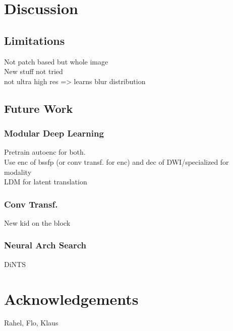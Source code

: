 \chapter{Discussion}\label{\positionnumber}

\section{Limitations}
Not patch based but whole image\\
New stuff not tried\\
not ultra high res => learns blur distribution\\

\section{Future Work}
\subsection{Modular Deep Learning}
Pretrain autoenc for both.\\
Use enc of bssfp (or conv transf. for enc) and dec of DWI/specialized for modality\\
LDM for latent translation\\

\subsection{Conv Transf.}
New kid on the block\\

\subsection{Neural Arch Search}
DiNTS



\chapter{Acknowledgements}
Rahel, Flo, Klaus
